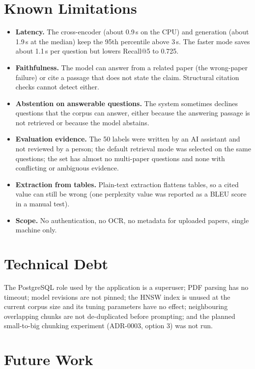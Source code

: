 \section{Known Limitations}

\begin{itemize}
  \item \textbf{Latency.} The cross-encoder (about 0.9\,s on the CPU) and generation (about 1.9\,s at the median)
        keep the 95th percentile above 3\,s. The faster  mode saves about 1.1\,s per question but
        lowers Recall@5 to 0.725.
  \item \textbf{Faithfulness.} The model can answer from a related paper (the wrong-paper failure) or cite a passage
        that does not state the claim. Structural citation checks cannot detect either.
  \item \textbf{Abstention on answerable questions.} The system sometimes declines questions that the corpus can
        answer, either because the answering passage is not retrieved or because the model abstains.
  \item \textbf{Evaluation evidence.} The 50 labels were written by an AI assistant and not reviewed by a person;
        the default retrieval mode was selected on the same questions; the set has almost no multi-paper questions
        and none with conflicting or ambiguous evidence.
  \item \textbf{Extraction from tables.} Plain-text extraction flattens tables, so a cited value can still be wrong
        (one perplexity value was reported as a BLEU score in a manual test).
  \item \textbf{Scope.} No authentication, no OCR, no metadata for uploaded papers, single machine only.
\end{itemize}

\section{Technical Debt}

The PostgreSQL role used by the application is a superuser; PDF parsing has no timeout; model revisions are not
pinned; the HNSW index is unused at the current corpus size and its tuning parameters have no effect; neighbouring
overlapping chunks are not de-duplicated before prompting; and the planned small-to-big chunking experiment
(ADR-0003, option 3) was not run.

\section{Future Work}

